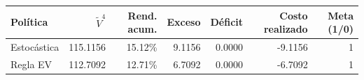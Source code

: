 {\small
\begin{tabular}{lrrrrrr}
\toprule
Política & $\tilde V^4$ & Rend. acum. & Exceso & Déficit & Costo realizado & Meta (1/0) \\
\midrule
Estocástica & 115.1156 & 15.12\% & 9.1156 & 0.0000 & -9.1156 & 1 \\
Regla EV & 112.7092 & 12.71\% & 6.7092 & 0.0000 & -6.7092 & 1 \\
\bottomrule
\end{tabular}
}
